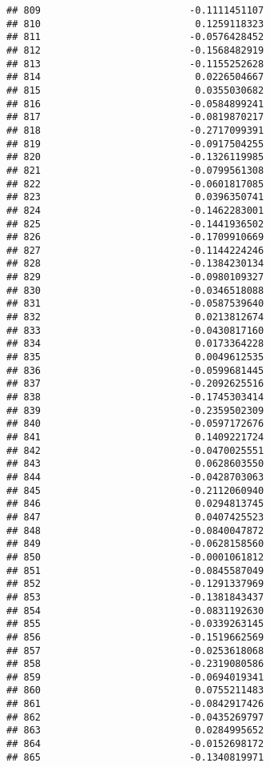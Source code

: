\documentclass[
]{article}
\begin{document}
\begin{verbatim}
## 809                          -0.1111451107
## 810                           0.1259118323
## 811                          -0.0576428452
## 812                          -0.1568482919
## 813                          -0.1155252628
## 814                           0.0226504667
## 815                           0.0355030682
## 816                          -0.0584899241
## 817                          -0.0819870217
## 818                          -0.2717099391
## 819                          -0.0917504255
## 820                          -0.1326119985
## 821                          -0.0799561308
## 822                          -0.0601817085
## 823                           0.0396350741
## 824                          -0.1462283001
## 825                          -0.1441936502
## 826                          -0.1709910669
## 827                          -0.1144224246
## 828                          -0.1384230134
## 829                          -0.0980109327
## 830                          -0.0346518088
## 831                          -0.0587539640
## 832                           0.0213812674
## 833                          -0.0430817160
## 834                           0.0173364228
## 835                           0.0049612535
## 836                          -0.0599681445
## 837                          -0.2092625516
## 838                          -0.1745303414
## 839                          -0.2359502309
## 840                          -0.0597172676
## 841                           0.1409221724
## 842                          -0.0470025551
## 843                           0.0628603550
## 844                          -0.0428703063
## 845                          -0.2112060940
## 846                           0.0294813745
## 847                           0.0407425523
## 848                          -0.0840047872
## 849                          -0.0628158560
## 850                          -0.0001061812
## 851                          -0.0845587049
## 852                          -0.1291337969
## 853                          -0.1381843437
## 854                          -0.0831192630
## 855                          -0.0339263145
## 856                          -0.1519662569
## 857                          -0.0253618068
## 858                          -0.2319080586
## 859                          -0.0694019341
## 860                           0.0755211483
## 861                          -0.0842917426
## 862                          -0.0435269797
## 863                           0.0284995652
## 864                          -0.0152698172
## 865                          -0.1340819971

\end{verbatim}
\end{document}
